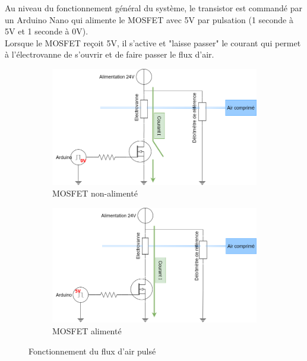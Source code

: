 Au niveau du fonctionnement général du système, le transistor est commandé par un Arduino Nano qui alimente le MOSFET avec 5V par pulsation (1 seconde à 5V et 1 seconde à 0V). \\
Lorsque le MOSFET reçoit 5V, il s'active et "laisse passer" le courant qui permet à l'électrovanne de s'ouvrir et de faire passer le
flux d'air.
\begin{figure}[H]
    \centering
    \begin{subfigure}[b]{0.45\textwidth}
        \hspace{-1.5cm}
        \includegraphics[scale = 0.3]{assets/figures/MOSFET_0V.png}
        \caption{MOSFET non-alimenté}
        \label{fig:MOSFET_0V}
    \end{subfigure}
    \begin{subfigure}[b]{0.45\textwidth}
        \centering
        \includegraphics[scale = 0.3]{assets/figures/MOSFET_5V.png}
        \caption{MOSFET alimenté}
        \label{fig:MOSFET_5V}
    \end{subfigure}
    \caption{Fonctionnement du flux d'air pulsé}
    \label{fig:flux_pulse}
\end{figure}

